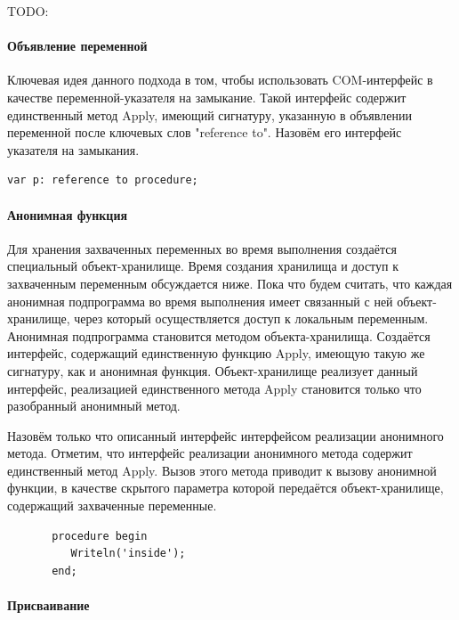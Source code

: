 \documentclass{imcs}
\begin{document}

\iffalse TODO:

\paragraph{Объявление переменной}

Ключевая идея данного подхода в том, чтобы использовать COM-интерфейс в качестве переменной-указателя
на замыкание. Такой интерфейс содержит единственный метод Apply, имеющий сигнатуру, указанную
в объявлении переменной после ключевых слов "reference to". Назовём его интерфейс указателя на
замыкания.

\begin{lstlisting}
var p: reference to procedure;
\end{lstlisting}

\paragraph{Анонимная функция}

Для хранения захваченных переменных во время выполнения
создаётся специальный объект-хранилище. Время создания хранилища
и доступ к захваченным переменным обсуждается ниже. Пока что будем считать, что каждая анонимная
подпрограмма во время выполнения имеет связанный с ней объект-хранилище, через
который осуществляется доступ к локальным переменным.
Анонимная подпрограмма становится методом объекта-хранилища. Создаётся интерфейс, содержащий
единственную функцию Apply, имеющую такую же сигнатуру, как и анонимная функция. Объект-хранилище
реализует данный интерфейс, реализацией единственного метода Apply становится только что
разобранный анонимный метод.

Назовём только что описанный интерфейс интерфейсом реализации анонимного метода. Отметим, что
интерфейс реализации анонимного метода содержит единственный метод Apply. Вызов этого метода
приводит к вызову анонимной функции, в качестве скрытого параметра которой
передаётся объект-хранилище, содержащий захваченные переменные.

\begin{lstlisting}
       procedure begin
          Writeln('inside');
       end;
\end{lstlisting}


\paragraph{Присваивание}
\end{document}
